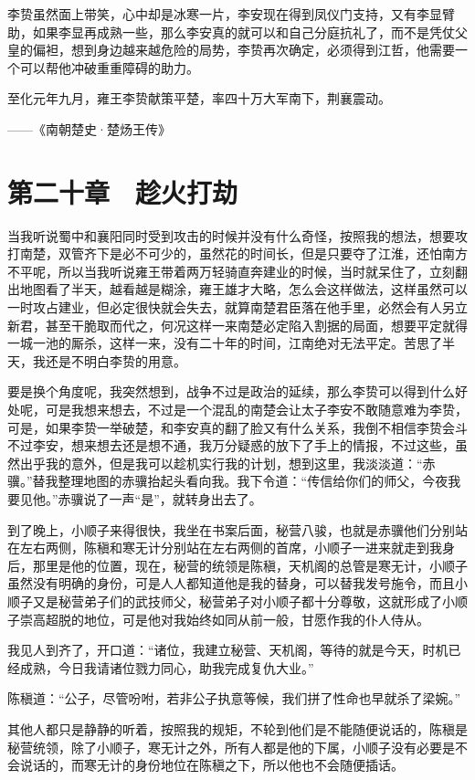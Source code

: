 李贽虽然面上带笑，心中却是冰寒一片，李安现在得到凤仪门支持，又有李显臂助，如果李显再成熟一些，那么李安真的就可以和自己分庭抗礼了，而不是凭仗父皇的偏袒，想到身边越来越危险的局势，李贽再次确定，必须得到江哲，他需要一个可以帮他冲破重重障碍的助力。

至化元年九月，雍王李贽献策平楚，率四十万大军南下，荆襄震动。

——《南朝楚史·楚炀王传》

\chapter{第二十章　趁火打劫}

当我听说蜀中和襄阳同时受到攻击的时候并没有什么奇怪，按照我的想法，想要攻打南楚，双管齐下是必不可少的，虽然花的时间长，但是只要夺了江淮，还怕南方不平呢，所以当我听说雍王带着两万轻骑直奔建业的时候，当时就呆住了，立刻翻出地图看了半天，越看越是糊涂，雍王雄才大略，怎么会这样做法，这样虽然可以一时攻占建业，但必定很快就会失去，就算南楚君臣落在他手里，必然会有人另立新君，甚至干脆取而代之，何况这样一来南楚必定陷入割据的局面，想要平定就得一城一池的厮杀，这样一来，没有二十年的时间，江南绝对无法平定。苦思了半天，我还是不明白李贽的用意。

要是换个角度呢，我突然想到，战争不过是政治的延续，那么李贽可以得到什么好处呢，可是我想来想去，不过是一个混乱的南楚会让太子李安不敢随意难为李贽，可是，如果李贽一举破楚，和李安真的翻了脸又有什么关系，我倒不相信李贽会斗不过李安，想来想去还是想不通，我万分疑惑的放下了手上的情报，不过这些，虽然出乎我的意外，但是我可以趁机实行我的计划，想到这里，我淡淡道：“赤骥。”替我整理地图的赤骥抬起头看向我。我下令道：“传信给你们的师父，今夜我要见他。”赤骥说了一声“是”，就转身出去了。

到了晚上，小顺子来得很快，我坐在书案后面，秘营八骏，也就是赤骥他们分别站在左右两侧，陈稹和寒无计分别站在左右两侧的首席，小顺子一进来就走到我身后，那里是他的位置，现在，秘营的统领是陈稹，天机阁的总管是寒无计，小顺子虽然没有明确的身份，可是人人都知道他是我的替身，可以替我发号施令，而且小顺子又是秘营弟子们的武技师父，秘营弟子对小顺子都十分尊敬，这就形成了小顺子崇高超脱的地位，可是他对我始终如同从前一般，甘愿作我的仆人侍从。

我见人到齐了，开口道：“诸位，我建立秘营、天机阁，等待的就是今天，时机已经成熟，今日我请诸位戮力同心，助我完成复仇大业。”

陈稹道：“公子，尽管吩咐，若非公子执意等候，我们拼了性命也早就杀了梁婉。”

其他人都只是静静的听着，按照我的规矩，不轮到他们是不能随便说话的，陈稹是秘营统领，除了小顺子，寒无计之外，所有人都是他的下属，小顺子没有必要是不会说话的，而寒无计的身份地位在陈稹之下，所以他也不会随便插话。

